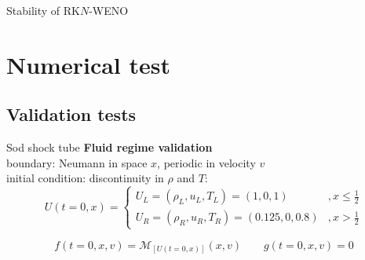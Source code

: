 \documentclass{beamer}
\begin{document}
\begin{frame}{Stability of RK$N$-WENO}
{\begin{figure}
      \end{figure}
  	}
  \end{frame}

  \section{Numerical test}
  \subsection{Validation tests}
  \begin{frame}{Sod shock tube}
  	\textbf{Fluid regime validation} \\

    boundary: Neumann in space $x$, periodic in velocity $v$ \\
    initial condition: discontinuity in $\rho$ and $T$:
    $$
      U(t=0,x) = \begin{cases}
        U_L = (\rho_L,u_L,T_L) = (1,0,1) &, x \leq \frac{1}{2} \\
        U_R = (\rho_R,u_R,T_R) = (0.125,0,0.8)              &, x > \frac{1}{2}
      \end{cases}
    $$

    $$
      f(t=0,x,v) = \mathcal{M}_{[U(t=0,x)]}(x,v) \qquad g(t=0,x,v) = 0
    $$
  \end{frame}
\end{document}
